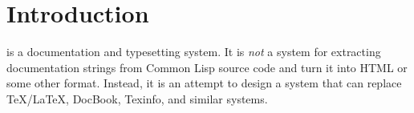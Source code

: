 \chapter{Introduction}
\setcounter{page}{1}%
%
\label{chap-introduction}%

\sysname is a documentation and typesetting system.  It is \emph{not}
a system for extracting documentation strings from Common Lisp source
code and turn it into HTML or some other format.  Instead, it is an
attempt to design a system that can replace TeX/LaTeX, DocBook,
Texinfo, and similar systems.
